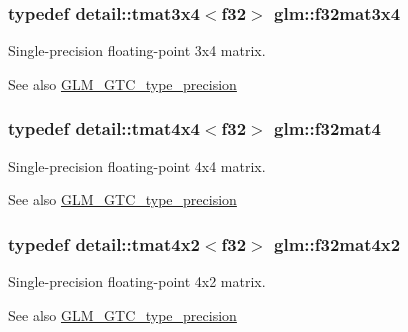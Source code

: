 \subsubsection[{f32mat3x4}]{\setlength{\rightskip}{0pt plus 5cm}typedef detail\+::tmat3x4$<$f32$>$ {\bf glm\+::f32mat3x4}}\label{group__gtc__type__precision_ga6ca7c9195aeb5fdc8a6b8dcba6ce4ab3}
Single-\/precision floating-\/point 3x4 matrix. \begin{DoxySeeAlso}{See also}
\hyperlink{group__gtc__type__precision}{G\+L\+M\+\_\+\+G\+T\+C\+\_\+type\+\_\+precision} 
\end{DoxySeeAlso}
\hypertarget{group__gtc__type__precision_gaf7b538eba9a2dd812c39ac7145e7cd93}{}
\subsubsection[{f32mat4}]{\setlength{\rightskip}{0pt plus 5cm}typedef detail\+::tmat4x4$<$f32$>$ {\bf glm\+::f32mat4}}\label{group__gtc__type__precision_gaf7b538eba9a2dd812c39ac7145e7cd93}
Single-\/precision floating-\/point 4x4 matrix. \begin{DoxySeeAlso}{See also}
\hyperlink{group__gtc__type__precision}{G\+L\+M\+\_\+\+G\+T\+C\+\_\+type\+\_\+precision} 
\end{DoxySeeAlso}
\hypertarget{group__gtc__type__precision_ga0049d706c1dc65ea5212a7b0ce64b0f0}{}
\subsubsection[{f32mat4x2}]{\setlength{\rightskip}{0pt plus 5cm}typedef detail\+::tmat4x2$<$f32$>$ {\bf glm\+::f32mat4x2}}\label{group__gtc__type__precision_ga0049d706c1dc65ea5212a7b0ce64b0f0}
Single-\/precision floating-\/point 4x2 matrix. \begin{DoxySeeAlso}{See also}
\hyperlink{group__gtc__type__precision}{G\+L\+M\+\_\+\+G\+T\+C\+\_\+type\+\_\+precision} 
\end{DoxySeeAlso}
\hypertarget{group__gtc__type__precision_ga0b80103fc9c41a559c616e3f84dc570f}{}
